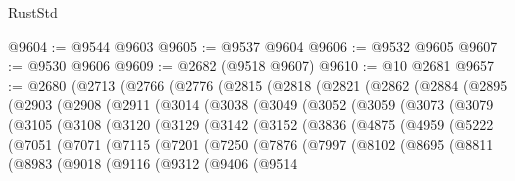 \begin{lexlean}{RustStd}
\begin{coremodule}
@9604 := @9544 @9603
@9605 := @9537 @9604
@9606 := @9532 @9605
@9607 := @9530 @9606
@9609 := @2682 (@9518 @9607)
@9610 := @10 @2681
@9657 := @2680
    (@2713
      (@2766
        (@2776
          (@2815
            (@2818
              (@2821
                (@2862
                  (@2884
                    (@2895
                      (@2903
                        (@2908
                          (@2911
                            (@3014
                              (@3038
                                (@3049
                                  (@3052
                                    (@3059
                                      (@3073
                                        (@3079
                                          (@3105
                                            (@3108
                                              (@3120
                                                (@3129
                                                  (@3142
                                                    (@3152
                                                      (@3836
                                                        (@4875
                                                          (@4959
                                                            (@5222
                                                              (@7051
                                                                (@7071
                                                                  (@7115
                                                                    (@7201
                                                                      (@7250
                                                                        (@7876
                                                                          (@7997
                                                                            (@8102
                                                                              (@8695
                                                                                (@8811
                                                                                  (@8983
                                                                                    (@9018
                                                                                      (@9116
                                                                                        (@9312
                                                                                          (@9406
                                                                                            (@9514

\end{coremodule}
\end{lexlean}

